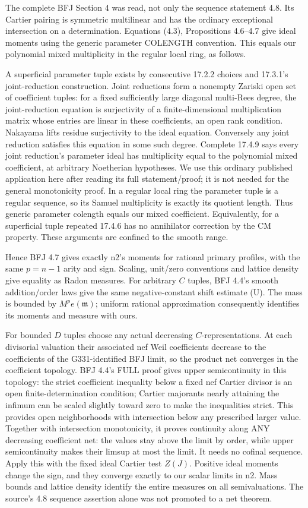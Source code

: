 \documentclass[11pt]{article}
\begin{document}
The complete BFJ Section 4 was read, not only the sequence statement 4.8. Its Cartier pairing is symmetric multilinear and has the ordinary exceptional intersection on a determination. Equations (4.3), Propositions 4.6--4.7 give ideal moments using the generic parameter COLENGTH convention. This equals our polynomial mixed multiplicity in the regular local ring, as follows.

A superficial parameter tuple exists by consecutive 17.2.2 choices and 17.3.1's joint-reduction construction. Joint reductions form a nonempty Zariski open set of coefficient tuples: for a fixed sufficiently large diagonal multi-Rees degree, the joint-reduction equation is surjectivity of a finite-dimensional multiplication matrix whose entries are linear in these coefficients, an open rank condition. Nakayama lifts residue surjectivity to the ideal equation. Conversely any joint reduction satisfies this equation in some such degree. Complete 17.4.9 says every joint reduction's parameter ideal has multiplicity equal to the polynomial mixed coefficient, at arbitrary Noetherian hypotheses. We use this ordinary published application here after reading its full statement/proof; it is not needed for the general monotonicity proof. In a regular local ring the parameter tuple is a regular sequence, so its Samuel multiplicity is exactly its quotient length. Thus generic parameter colength equals our mixed coefficient. Equivalently, for a superficial tuple repeated 17.4.6 has no annihilator correction by the CM property. These arguments are confined to the smooth range.

Hence BFJ 4.7 gives exactly n2's moments for rational primary profiles, with the same \(p=n-1\) arity and sign. Scaling, unit/zero conventions and lattice density give equality as Radon measures. For arbitrary \(C\) tuples, BFJ 4.4's smooth addition/order laws give the same negative-constant shift estimate (U). The mass is bounded by \(M^pe(\mathfrak m)\); uniform rational approximation consequently identifies its moments and measure with ours.

For bounded \(D\) tuples choose any actual decreasing \(C\)-representations. At each divisorial valuation their associated nef Weil coefficients decrease to the coefficients of the G331-identified BFJ limit, so the product net converges in the coefficient topology. BFJ 4.4's FULL proof gives upper semicontinuity in this topology: the strict coefficient inequality below a fixed nef Cartier divisor is an open finite-determination condition; Cartier majorants nearly attaining the infimum can be scaled slightly toward zero to make the inequalities strict. This provides open neighborhoods with intersection below any prescribed larger value. Together with intersection monotonicity, it proves continuity along ANY decreasing coefficient net: the values stay above the limit by order, while upper semicontinuity makes their limsup at most the limit. It needs no cofinal sequence. Apply this with the fixed ideal Cartier test \(Z(J)\). Positive ideal moments change the sign, and they converge exactly to our scalar limits in n2. Mass bounds and lattice density identify the entire measures on all semivaluations. The source's 4.8 sequence assertion alone was not promoted to a net theorem.
\end{document}
